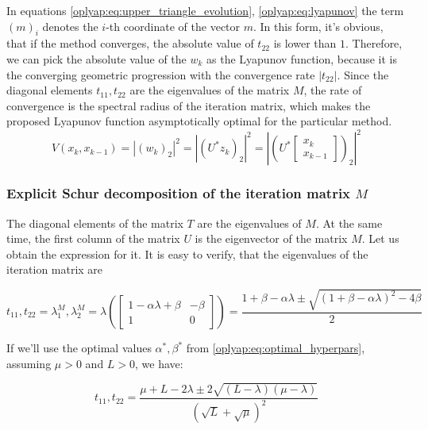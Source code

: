 \documentclass[a4paper,11pt]{article}
\begin{document}
In equations \eqref{oplyap:eq:upper_triangle_evolution}, \eqref{oplyap:eq:lyapunov} the term $(m)_i$ denotes the $i$-th coordinate of the vector $m$. In this form, it’s obvious, that if the method converges, the absolute value of $t_{22}$ is lower than $1$. Therefore, we can pick the absolute value of the $w_{k}$ as the Lyapunov function, because it is the converging geometric progression with the convergence rate $\vert t_{22}\vert$. Since the diagonal elements $t_{11}, t_{22}$ are the eigenvalues of the matrix $M$, the rate of convergence is the spectral radius of the iteration matrix, which makes the proposed Lyapunov function asymptotically optimal for the particular method. 
\begin{equation}
 \label{oplyap:eq:lyapunov}
 V(x_{k}, x_{k-1}) = | (w_{k})_2|^2 = | (U^* z_{k})_2|^2 = \left\vert \left(U^*\begin{bmatrix} x_k \\ x_{k-1} \end{bmatrix}\right)_2 \right\vert^2
\end{equation}

\subsubsection{Explicit Schur decomposition of the iteration matrix $M$}

The diagonal elements of the matrix $T$ are the eigenvalues of $M$. At the same time, the first column of the matrix $U$ is the eigenvector of the matrix $M$. Let us obtain the expression for it. It is easy to verify, that the eigenvalues of the iteration matrix are

\begin{equation}
 t_{11}, t_{22} = \lambda^M_1, \lambda^M_2 = \lambda \left( \begin{bmatrix} 
 1 - \alpha \lambda + \beta & -\beta \\
 1 & 0
 \end{bmatrix}\right) = \dfrac{1+\beta - \alpha \lambda \pm \sqrt{(1+\beta - \alpha\lambda)^2 - 4\beta}}{2}
\end{equation}

If we'll use the optimal values $\alpha^*, \beta^*$ from \eqref{oplyap:eq:optimal_hyperpars}, assuming $\mu > 0$ and $L>0$, we have:

\begin{equation}
 \label{oplyap:eq:optimal_eigs}
 t_{11}, t_{22} = \dfrac{\mu + L - 2\lambda \pm 2\sqrt{(L - \lambda)(\mu - \lambda)}}{(\sqrt{L} + \sqrt{\mu})^2}
\end{equation}
\end{document}
